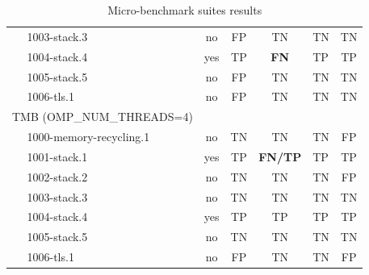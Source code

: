 \begin{table}[]
\begin{tabular}{llc|cclc}
		& 1003-stack.3                                           & no                    & FP                   & TN                   & TN                   & TN                     \\
		& 1004-stack.4                                           & yes                   & TP                   & \textbf{FN}          & TP                   & TP                     \\
		& 1005-stack.5                                           & no                    & FP                   & TN                   & TN                   & TN                     \\
		& 1006-tls.1                                             & no                    & FP                   & TN                   & TN                   & TN                     \\ \hline
		\multicolumn{2}{l}{TMB (OMP\_NUM\_THREADS=4)}            & \multicolumn{1}{l|}{} & \multicolumn{1}{l}{} & \multicolumn{1}{l}{} & \multicolumn{1}{c}{} & \multicolumn{1}{l}{}   \\ \hline
		& 1000-memory-recycling.1                                & no                    & TN                   & TN                   & TN                   & FP                     \\
		& 1001-stack.1                                           & yes                   & TP                   & \textbf{FN/TP}       & TP                   & TP                     \\
		& 1002-stack.2                                           & no                    & TN                   & TN                   & TN                   & FP                     \\
		& 1003-stack.3                                           & no                    & TN                   & TN                   & TN                   & TN                     \\
		& 1004-stack.4                                           & yes                   & TP                   & TP                   & TP                   & TP                     \\
		& 1005-stack.5                                           & no                    & TN                   & TN                   & TN                   & TN                     \\
		& 1006-tls.1                                             & no                    & FP                   & TN                   & TN                   & FP                  
	\end{tabular}
	\caption{Micro-benchmark suites results}
	\label{tbl:results-race-detection}
\end{table}
